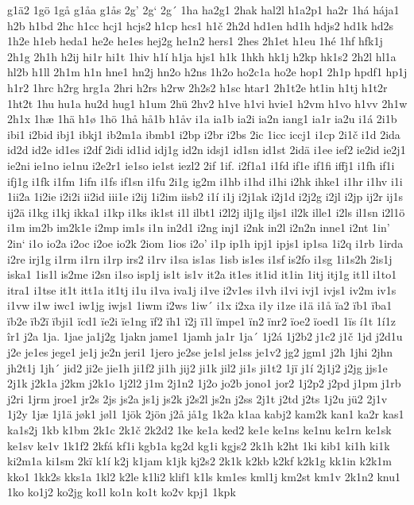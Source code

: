 g1ä2
1gö
1gå
g1åa
g1ås
2g'
2g`
2g´
1ha
ha2g1
2hak
hal2l
h1a2p1
ha2r
1há
hája1
h2b
h1bd
2hc
h1cc
hcj1
hcjs2
h1cp
hcs1
h1č
2h2d
hd1en
hd1h
hdjs2
hd1k
hd2s
1h2e
h1eb
heda1
he2e
he1es
hej2g
he1n2
hers1
2hes
2h1et
h1eu
1hé
1hf
hfk1j
2h1g
2h1h
h2ij
hi1r
hi1t
1hiv
h1í
h1ja
hjs1
h1k
1hkh
hk1j
h2kp
hk1s2
2h2l
hl1a
hl2b
h1ll
2h1m
h1n
hne1
hn2j
hn2o
h2ns
1h2o
ho2c1a
ho2e
hop1
2h1p
hpdf1
hp1j
h1r2
1hrc
h2rg
hrg1a
2hri
h2rs
h2rw
2h2s2
h1sc
htar1
2h1t2e
ht1in
h1tj
h1t2r
1ht2t
1hu
hu1a
hu2d
hug1
h1um
2hü
2hv2
h1ve
h1vi
hvie1
h2vm
h1vo
h1vv
2h1w
2h1x
1hæ
1hä
h1ø
1hö
1hå
hå1b
h1åv
i1a
ia1b
ia2i
ia2n
iang1
ia1r
ia2u
i1á
2i1b
ibi1
i2bid
ibj1
ibkj1
ib2m1a
ibmb1
i2bp
i2br
i2bs
2ic
1icc
iccj1
i1cp
2i1č
i1d
2ida
id2d
id2e
id1es
i2df
2idi
id1id
idj1g
id2n
idsj1
id1sn
id1st
2idä
i1ee
ief2
ie2id
ie2j1
ie2ni
ie1no
ie1nu
i2e2r1
ie1so
ie1st
iezl2
2if
1if.
i2f1a1
i1fd
if1e
if1fi
iffj1
i1fh
if1i
ifj1g
i1fk
i1fm
1ifn
i1fs
if1sn
i1fu
2i1g
ig2m
i1hb
i1hd
i1hi
i2hk
ihke1
i1hr
i1hv
i1i
1ii2a
1i2ie
i2i2i
ii2id
iii1e
i2ij
1i2im
iisb2
i1í
i1j
i2j1ak
i2j1d
i2j2g
i2jl
i2jp
ij2r
ij1s
ij2ä
i1kg
i1kj
ikka1
i1kp
i1ks
ik1st
i1l
ilbt1
i2l2j
ilj1g
iljs1
il2k
ille1
i2ls
il1sn
i2l1ö
i1m
im2b
im2k1e
i2mp
im1s
i1n
in2d1
i2ng
inj1
i2nk
in2l
i2n2n
inne1
i2nt
1in'
2in`
i1o
io2a
i2oc
i2oe
io2k
2iom
1ios
i2o'
i1p
ip1h
ipj1
ipjs1
ip1sa
1i2q
i1rb
1irda
i2re
irj1g
i1rm
i1rn
i1rp
irs2
i1rv
i1sa
is1as
1isb
is1es
i1sf
is2fo
i1sg
1i1s2h
2is1j
iska1
1is1l
is2me
i2sn
i1so
isp1j
is1t
is1v
it2a
it1es
it1id
it1in
1itj
itj1g
it1l
i1to1
itra1
i1tse
it1t
itt1a
it1tj
i1u
i1va
iva1j
i1ve
i2v1es
i1vh
i1vi
ivj1
ivjs1
iv2m
iv1s
i1vw
i1w
iwc1
iw1jg
iwjs1
1iwm
i2ws
1iw´
i1x
i2xa
i1y
i1ze
i1ä
i1å
ïa2
ïb1
ïba1
ïb2e
ïb2ï
ïbji1
ïcd1
ïe2i
ïe1ng
ïf2
ïh1
ï2j
ï1l
ïmpe1
ïn2
ïnr2
ïoe2
ïoed1
1ïs
í1t
1í1z
îr1
j2a
1ja.
1jae
ja1j2g
1jakn
jame1
1jamh
ja1r
1ja´
1j2á
1j2b2
j1c2
j1č
1jd
j2d1u
j2e
je1es
jege1
je1j
je2n
jeri1
1jero
je2se
je1sl
je1ss
je1v2
jg2
jgm1
j2h
1jhi
2jhn
jh2t1j
1jh´
jid2
ji2e
jie1h
ji1f2
ji1h
jij2
ji1k
jil2
ji1s
ji1t2
1jï
j1í
2j1j2
j2jg
jjs1e
2j1k
j2k1a
j2km
j2k1o
1j2l2
j1m
2j1n2
1j2o
jo2b
jono1
jor2
1j2p2
j2pd
j1pm
j1rb
j2ri
1jrm
jroe1
jr2s
2js
js2a
js1j
js2k
j2s2l
js2n
j2ss
2j1t
j2td
j2ts
1j2u
jü2
2j1v
1j2y
1jæ
1j1ä
jøk1
jøl1
1jök
2jön
j2å
jå1g
1k2a
k1aa
kabj2
kam2k
kan1
ka2r
kas1
ka1s2j
1kb
k1bm
2k1c
2k1č
2k2d2
1ke
ke1a
ked2
ke1e
ke1ns
ke1nu
ke1rn
ke1sk
ke1sv
ke1v
1k1f2
2kfá
kf1i
kgb1a
kg2d
kg1i
kgjs2
2k1h
k2ht
1ki
kib1
ki1h
ki1k
ki2m1a
ki1sm
2kï
k1í
k2j
k1jam
k1jk
kj2s2
2k1k
k2kb
k2kf
k2k1g
kk1in
k2k1m
kko1
1kk2s
kks1a
1kl2
k2le
k1li2
klif1
k1ls
km1es
kml1j
km2st
km1v
2k1n2
knu1
1ko
ko1j2
ko2jg
ko1l
ko1n
ko1t
ko2v
kpj1
1kpk
